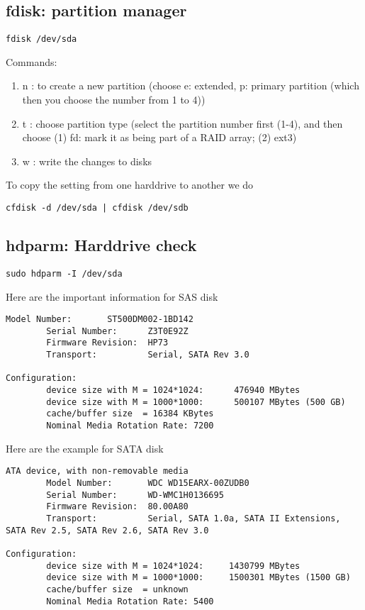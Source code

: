 \subsection{fdisk: partition manager}

\begin{verbatim}
fdisk /dev/sda
\end{verbatim}
Commands:
\begin{enumerate}
  \item n : to create a new partition (choose e: extended, p: primary partition
  (which then you choose the number from 1 to 4))
  \item t : choose partition type (select the partition number first (1-4), and
  then choose (1) fd: mark it as being part of a RAID array; (2) ext3)
  \item w : write the changes to disks
\end{enumerate}

To copy the setting from one harddrive to another we do
\begin{verbatim}
cfdisk -d /dev/sda | cfdisk /dev/sdb
\end{verbatim}

\subsection{hdparm: Harddrive check}
\label{sec:hdparm}


\begin{verbatim}
sudo hdparm -I /dev/sda
\end{verbatim}

Here are the important information for SAS disk
{\tiny
\begin{verbatim}
Model Number:       ST500DM002-1BD142                       
        Serial Number:      Z3T0E92Z            
        Firmware Revision:  HP73    
        Transport:          Serial, SATA Rev 3.0

Configuration:
        device size with M = 1024*1024:      476940 MBytes
        device size with M = 1000*1000:      500107 MBytes (500 GB)
        cache/buffer size  = 16384 KBytes
        Nominal Media Rotation Rate: 7200

\end{verbatim}
}

Here are the example for SATA disk
{\tiny
\begin{verbatim}
ATA device, with non-removable media
        Model Number:       WDC WD15EARX-00ZUDB0                    
        Serial Number:      WD-WMC1H0136695
        Firmware Revision:  80.00A80
        Transport:          Serial, SATA 1.0a, SATA II Extensions, SATA Rev 2.5, SATA Rev 2.6, SATA Rev 3.0

Configuration:
        device size with M = 1024*1024:     1430799 MBytes
        device size with M = 1000*1000:     1500301 MBytes (1500 GB)
        cache/buffer size  = unknown
        Nominal Media Rotation Rate: 5400
\end{verbatim}
}

